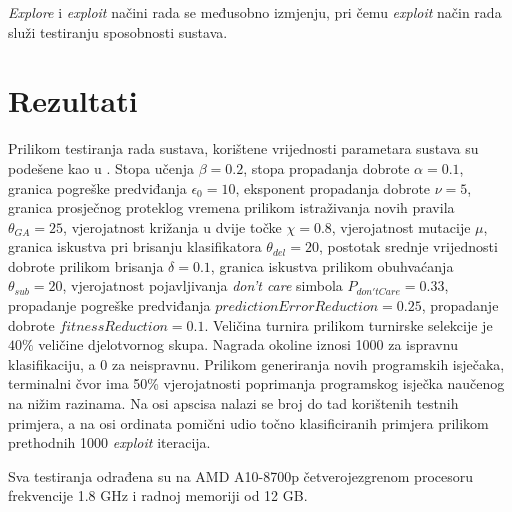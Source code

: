 \documentclass[times, utf8, zavrsni]{fer}
\begin{document}
\emph{Explore} i \emph{exploit} načini rada se međusobno izmjenju, pri čemu \emph{exploit} način rada služi testiranju sposobnosti sustava.

\chapter{Rezultati} \label{ch:res}
Prilikom testiranja rada sustava, korištene vrijednosti parametara sustava su podešene kao u \citep{4}.
Stopa učenja $\beta = 0.2$, stopa propadanja dobrote $\alpha = 0.1$, granica pogreške predviđanja $\epsilon_{0} = 10$, eksponent propadanja dobrote $\nu = 5$, granica prosječnog proteklog vremena prilikom istraživanja novih pravila $\theta_{GA} = 25$, vjerojatnost križanja u dvije točke $\chi = 0.8$, vjerojatnost mutacije $\mu$, granica iskustva pri brisanju klasifikatora $\theta_{del} = 20$, postotak srednje vrijednosti dobrote prilikom brisanja $\delta = 0.1$, granica iskustva prilikom obuhvaćanja $\theta_{sub} = 20$, vjerojatnost pojavljivanja \emph{don't care} simbola $P_{don'tCare} = 0.33$, propadanje pogreške predviđanja $predictionErrorReduction = 0.25$, propadanje dobrote $fitnessReduction = 0.1$.
Veličina turnira prilikom turnirske selekcije je $40\%$ veličine djelotvornog skupa.
Nagrada okoline iznosi 1000 za ispravnu klasifikaciju, a 0 za neispravnu.
Prilikom generiranja novih programskih isječaka, terminalni čvor ima 50\% vjerojatnosti poprimanja programskog isječka naučenog na nižim razinama.
Na osi apscisa nalazi se broj do tad korištenih testnih primjera, a na osi ordinata pomični udio točno klasificiranih primjera prilikom prethodnih 1000 \emph{exploit} iteracija.

Sva testiranja odrađena su na AMD A10-8700p četverojezgrenom procesoru frekvencije 1.8 GHz i radnoj memoriji od 12 GB.
\end{document}
